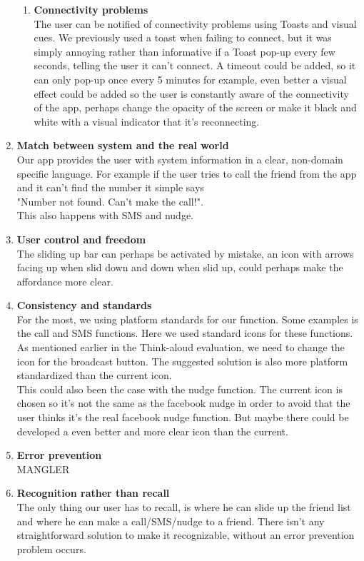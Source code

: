 \documentclass[runningheads,a4paper]{llncs}
\begin{document}
\begin{enumerate}
\begin{enumerate}
    \item \textbf{Connectivity problems}\\
    The user can be notified of connectivity problems using Toasts and visual cues. 
We previously used a toast when failing to connect, but it was simply annoying rather than informative if a Toast pop-up every few seconds, telling the user it can’t connect. A timeout could be added, so it can only pop-up once every 5 minutes for example, even better a visual effect could be added so the user is constantly aware of the connectivity of the app, perhaps change the opacity of the screen or make it black and white with a visual indicator that it’s reconnecting.  
  \end{enumerate}
  \item \textbf{Match between system and the real world
}\\
Our app provides the user with system information in a clear, non-domain specific language. For example if the user tries to call the friend from the app and it can’t find the number it simple says \\
"Number not found. Can't make the call!".\\
This also happens with SMS and nudge.
  \item \textbf{User control and freedom}\\
  The sliding up bar can perhaps be activated by mistake, an icon with arrows facing up when slid down and down when slid up, could perhaps make the affordance more clear.
  \item \textbf{Consistency and standards}\\
  For the most, we using platform standards for our function. Some examples is the call and SMS functions. Here we used standard icons for these functions. 
As mentioned earlier in the Think-aloud evaluation, we need to change the icon for the broadcast button. The suggested solution is also more platform standardized than the current icon. \\
This could also been the case with the nudge function. The current icon is chosen so it’s not the same as the facebook nudge in order to avoid that the user thinks it’s the real facebook nudge function. But maybe there could be developed a even better and more clear icon than the current.
\item \textbf{Error prevention}\\
MANGLER
\item \textbf{Recognition rather than recall}\\
The only thing our user has to recall, is where he can slide up the friend list and where he can make a call/SMS/nudge to a friend. There isn’t any straightforward solution to make it recognizable, without an error prevention problem occurs.

\end{enumerate}
\end{document}
